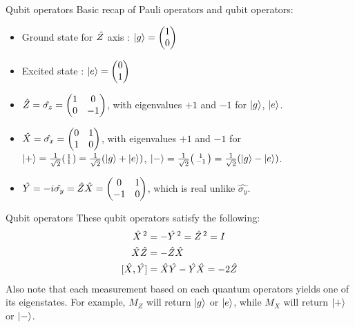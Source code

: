 \documentclass{beamer}
\begin{document}
    \begin{frame}{Qubit operators}
        Basic recap of Pauli operators and qubit operators:
        \begin{itemize}
            \item Ground state for $\shat{Z}$ axis : $\ket{g} = \begin{pmatrix} 1 \\ 0 \end{pmatrix}$
            \item Excited state : $\ket{e} = \begin{pmatrix} 0 \\ 1 \end{pmatrix}$
            \item $\shat{Z} = \hat{\sigma_z} = \begin{pmatrix}
            1 & 0 \\
            0 & -1
            \end{pmatrix}$, with eigenvalues $+1$ and $-1$ for $\ket{g}$, $ \ket{e} $.
            \item $\shat{X} = \hat{\sigma_x} = \begin{pmatrix}
            0 & 1 \\
            1 & 0
            \end{pmatrix}$, with eigenvalues $+1$ and $-1$ for $\ket{+} = \frac{1}{\sqrt{2}}\begin{psmallmatrix} 1 \\ 1 \end{psmallmatrix} = \frac{1}{\sqrt{2}}(\ket{g} + \ket{e})$, $\ket{-} = \frac{1}{\sqrt{2}}\begin{psmallmatrix} 1 \\ -1 \end{psmallmatrix} = \frac{1}{\sqrt{2}}(\ket{g} - \ket{e})$.
            \item $\shat{Y} = -i\hat{\sigma_y} = \shat{Z}\shat{X} = \begin{pmatrix}
            0 & 1 \\
            -1 & 0
            \end{pmatrix}$, which is real unlike $ \hat{\sigma_y} $.
        \end{itemize}
    \end{frame}
    
    \begin{frame}{Qubit operators}
        These qubit operators satisfy the following:
        \begin{equation}
        \begin{split}
            \shat{X}\,^2 &= -\shat{Y}\,^2 = \shat{Z}\,^2 = I \\
            \shat{X}\shat{Z} &= -\shat{Z}\shat{X} \\
            [\shat{X},\shat{Y}] &= \shat{X}\shat{Y} - \shat{Y}\shat{X} = -2\shat{Z}
        \end{split}
        \label{eq:quant_op}
        \end{equation}
        Also note that each measurement based on each quantum operators yields one of its eigenstates. For example, $M_Z$ will return $ \ket{g} $ or $ \ket{e} $, while $ M_X $ will return $ \ket{+} $ or $ \ket{-} $.
    \end{frame}
    
\end{document}
